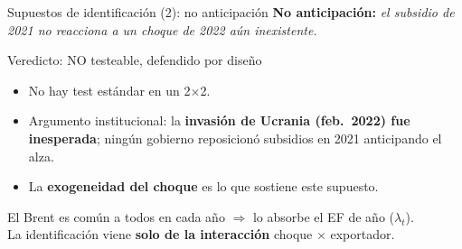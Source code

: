 \documentclass[aspectratio=169,10pt]{beamer}
\newcommand{\key}[1]{{\bfseries\color{AcentoRojo}#1}}
\begin{document}
\begin{frame}{Supuestos de identificación (2): no anticipación}
  \textbf{No anticipación:} \emph{el subsidio de 2021 no reacciona a un choque de 2022 aún inexistente.}

  \begin{block}{Veredicto: NO testeable, defendido por diseño}
    \begin{itemize}
      \item No hay test estándar en un 2$\times$2.
      \item Argumento institucional: la \key{invasión de Ucrania (feb.\ 2022) fue inesperada};
            ningún gobierno reposicionó subsidios en 2021 anticipando el alza.
      \item La \textbf{exogeneidad del choque} es lo que sostiene este supuesto.
    \end{itemize}
  \end{block}

  \begin{center}
  \color{GrisMedio}\small
  El Brent es común a todos en cada año $\Rightarrow$ lo absorbe el EF de año ($\lambda_t$).\\
  La identificación viene \textbf{solo de la interacción} choque $\times$ exportador.
  \end{center}

\end{frame}
\end{document}
